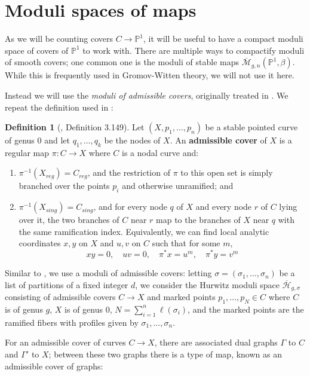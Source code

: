 \documentclass[thesis]{thesis-umich}           %
\newcommand{\Hb}{\overline{\mathcal H}}
\renewcommand{\P}{\mathbb P}
\theoremstyle{definition}
\newtheorem{dfn}[thm]{Definition}
\begin{document}
\section{Moduli spaces of maps}

As we will be counting covers $C\to\P^1$, it will be useful
to have a compact moduli space of covers of $\P^1$ to work with.
There are multiple ways to compactify moduli of smooth covers;
one common one is the moduli of stable maps $\overline{\mathcal M}_{g,n}(\P^1,\beta)$. While this is frequently used in Gromov-Witten theory,
we will not use it here.

Instead we will use the {\it moduli of admissible covers}, originally
treated in \cite{Admissible}. We repeat the definition used in \cite{Moduli}:

\begin{dfn}[\cite{Moduli}, Definition 3.149]
  Let $(X,p_1,\dots,p_n)$ be a stable pointed curve of genus $0$
  and let $q_1,\dots,q_k$ be the nodes of $X$.
  An {\bf admissible cover} of $X$ is a regular map $\pi:C\to X$ where $C$ is
  a nodal curve and:
  \begin{enumerate}
  \item $\pi^{-1}(X_{reg})=C_{reg}$, and the restriction of $\pi$ to
    this open set is simply branched over the points $p_i$ and otherwise
    unramified; and
  \item $\pi^{-1}(X_{sing})=C_{sing}$, and for every node $q$ of $X$ and
    every node $r$ of $C$ lying over it, the two branches of $C$ near
    $r$ map to the branches of $X$ near $q$ with the same ramification index.
    Equivalently, we can find local analytic coordinates $x,y$ on $X$ and $u,v$ on $C$ such that for some $m$,
    \[
    xy=0,\quad uv=0,\quad \pi^*x=u^m,\quad \pi^*y=v^m
    \]
    \end{enumerate}

  \end{dfn}

Similar to \cite{Generalized}, we use
a moduli of admissible covers: letting
$\sigma=(\sigma_1,\dots,\sigma_n)$ be a list of
partitions of a fixed integer $d$, we consider the
Hurwitz moduli space $\Hb_{g,\sigma}$ consisting of admissible covers
$C\to X$ and marked points $p_1,\dots,p_N\in C$ where $C$ is
of genus $g$, $X$ is of genus $0$,
$N=\sum_{i=1}^n\ell(\sigma_i)$, and the marked points
are the ramified fibers with profiles given by $\sigma_1,\dots,\sigma_n$.

For an admissible cover of curves $C\to X$, there are associated dual
graphs $\Gamma$ to $C$ and $\Gamma'$ to $X$; between these two graphs
there is a type of map, known as an admissible cover of graphs:
\end{document}
